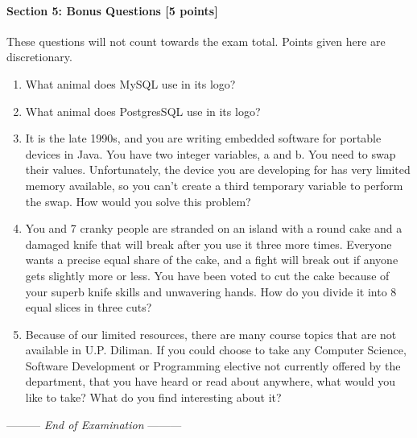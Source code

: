 \documentclass[a4paper,12pt,leqno]{article}
\newcommand{\lastwords}{End of Examination}
\begin{document}
\newpage
\paragraph{\textbf{Section 5: Bonus Questions [5 points]}\\}

These questions will not count towards the exam total. Points given here are discretionary. 

\begin{enumerate}
\item What animal does MySQL use in its logo?

\item What animal does PostgresSQL use in its logo?

\item It is the late 1990s, and you are writing embedded software for portable devices in Java. You have two integer variables, a and b. You need to swap their values. Unfortunately, the device you are developing for has very limited memory available, so you can't create a third temporary variable to perform the swap. How would you solve this problem? 

\item You and 7 cranky people are stranded on an island with a round cake and a damaged knife that will break after you use it three more times. Everyone wants a precise equal share of the cake, and a fight will break out if anyone gets slightly more or less. You have been voted to cut the cake because of your superb knife skills and unwavering hands. How do you divide it into 8 equal slices in three cuts?

\item Because of our limited resources, there are many course topics that are not available in U.P. Diliman. If you could choose to take any Computer Science, Software Development or Programming elective not currently offered by the department, that you have heard or read about anywhere, what would you like to take? What do you find interesting about it?

\end{enumerate}

\begin{center}
\vspace{3cm}
--------- \textit{\lastwords} ---------
\end{center}


\label{finalpage}
\end{document}
